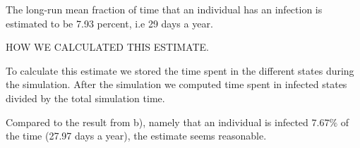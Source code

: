 The long-run mean fraction of time that an individual has an infection is estimated to be 7.93 percent, i.e 29 days a year.  

HOW WE CALCULATED THIS ESTIMATE.

To calculate this estimate we stored the time spent in the different states during the simulation. After the simulation we computed time spent in infected states divided by the total simulation time. 

Compared to the result from b), namely that an individual is infected $7.67\%$ of the time  (27.97 days a year), the estimate seems reasonable. 



